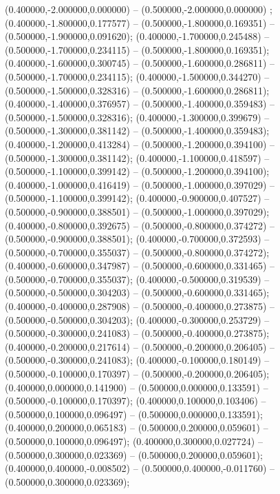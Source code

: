  (0.400000,-2.000000,0.000000) -- (0.500000,-2.000000,0.000000) ;
 (0.400000,-1.800000,0.177577) -- (0.500000,-1.800000,0.169351) -- (0.500000,-1.900000,0.091620);
 (0.400000,-1.700000,0.245488) -- (0.500000,-1.700000,0.234115) -- (0.500000,-1.800000,0.169351);
 (0.400000,-1.600000,0.300745) -- (0.500000,-1.600000,0.286811) -- (0.500000,-1.700000,0.234115);
 (0.400000,-1.500000,0.344270) -- (0.500000,-1.500000,0.328316) -- (0.500000,-1.600000,0.286811);
 (0.400000,-1.400000,0.376957) -- (0.500000,-1.400000,0.359483) -- (0.500000,-1.500000,0.328316);
 (0.400000,-1.300000,0.399679) -- (0.500000,-1.300000,0.381142) -- (0.500000,-1.400000,0.359483);
 (0.400000,-1.200000,0.413284) -- (0.500000,-1.200000,0.394100) -- (0.500000,-1.300000,0.381142);
 (0.400000,-1.100000,0.418597) -- (0.500000,-1.100000,0.399142) -- (0.500000,-1.200000,0.394100);
 (0.400000,-1.000000,0.416419) -- (0.500000,-1.000000,0.397029) -- (0.500000,-1.100000,0.399142);
 (0.400000,-0.900000,0.407527) -- (0.500000,-0.900000,0.388501) -- (0.500000,-1.000000,0.397029);
 (0.400000,-0.800000,0.392675) -- (0.500000,-0.800000,0.374272) -- (0.500000,-0.900000,0.388501);
 (0.400000,-0.700000,0.372593) -- (0.500000,-0.700000,0.355037) -- (0.500000,-0.800000,0.374272);
 (0.400000,-0.600000,0.347987) -- (0.500000,-0.600000,0.331465) -- (0.500000,-0.700000,0.355037);
 (0.400000,-0.500000,0.319539) -- (0.500000,-0.500000,0.304203) -- (0.500000,-0.600000,0.331465);
 (0.400000,-0.400000,0.287908) -- (0.500000,-0.400000,0.273875) -- (0.500000,-0.500000,0.304203);
 (0.400000,-0.300000,0.253729) -- (0.500000,-0.300000,0.241083) -- (0.500000,-0.400000,0.273875);
 (0.400000,-0.200000,0.217614) -- (0.500000,-0.200000,0.206405) -- (0.500000,-0.300000,0.241083);
 (0.400000,-0.100000,0.180149) -- (0.500000,-0.100000,0.170397) -- (0.500000,-0.200000,0.206405);
 (0.400000,0.000000,0.141900) -- (0.500000,0.000000,0.133591) -- (0.500000,-0.100000,0.170397);
 (0.400000,0.100000,0.103406) -- (0.500000,0.100000,0.096497) -- (0.500000,0.000000,0.133591);
 (0.400000,0.200000,0.065183) -- (0.500000,0.200000,0.059601) -- (0.500000,0.100000,0.096497);
 (0.400000,0.300000,0.027724) -- (0.500000,0.300000,0.023369) -- (0.500000,0.200000,0.059601);
 (0.400000,0.400000,-0.008502) -- (0.500000,0.400000,-0.011760) -- (0.500000,0.300000,0.023369);
